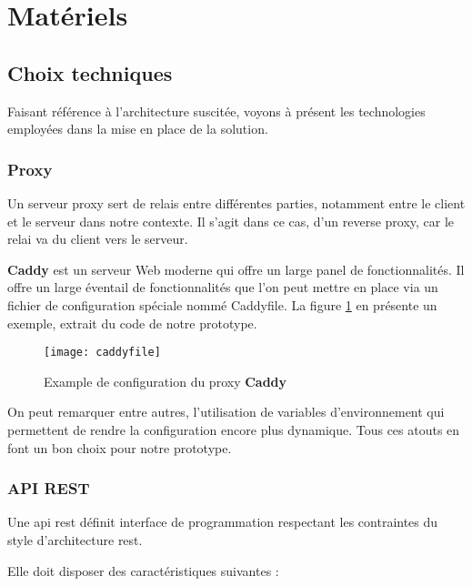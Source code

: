 \section{Matériels}
\subsection{Choix techniques}
Faisant référence à l’architecture suscitée, 
voyons à présent les technologies employées dans la mise en place de la solution.

\subsubsection{Proxy}
Un serveur proxy sert de relais entre différentes parties, notamment entre le client et le serveur dans notre contexte. 
Il s’agit dans ce cas, d’un reverse proxy, car le relai va du client vers le serveur.
 
\textbf{Caddy} est un serveur Web moderne qui offre un large panel de fonctionnalités. 
Il offre un large éventail de fonctionnalités que l’on peut mettre en place via un fichier de configuration spéciale nommé Caddyfile. 
La figure \ref{fig:caddyfile} en présente un exemple, extrait du code de notre prototype.


\begin{figure}[H]
  \centering
  \texttt{[image: caddyfile]}
  \caption{Example de configuration du proxy \textbf{Caddy}}
  \label{fig:caddyfile}
\end{figure}

On peut remarquer entre autres, l’utilisation de variables d’environnement qui permettent de rendre la configuration encore plus dynamique. 
Tous ces atouts en font un bon choix pour notre prototype.

\subsubsection{API REST}

Une \acrshort{api} \acrshort{rest} définit interface de programmation respectant les contraintes du style d’architecture \acrlong{rest}.

Elle doit disposer des caractéristiques suivantes :

